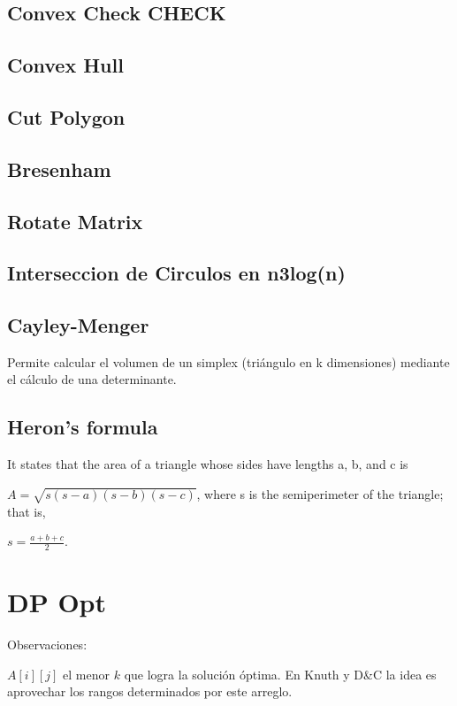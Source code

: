 \subsection{Convex Check CHECK}
\subsection{Convex Hull}
\subsection{Cut Polygon}
\subsection{Bresenham}
\subsection{Rotate Matrix}
\subsection{Interseccion de Circulos en n3log(n)}

\subsection{Cayley-Menger}
{
Permite calcular el volumen de un simplex (triángulo en k dimensiones) mediante el cálculo de una determinante.
}

\subsection{Heron's formula}
{
It states that the area of a triangle whose sides have lengths a, b, and c is

\( {\displaystyle A={\sqrt {s(s-a)(s-b)(s-c)}}} \),
where s is the semiperimeter of the triangle; that is,

\( {\displaystyle s={\frac {a+b+c}{2}}} \).
}

\section{DP Opt}
Observaciones:

$A[i][j]$ el menor $k$ que logra la solución óptima. En Knuth y D\&C la idea es aprovechar los rangos
determinados por este arreglo.


